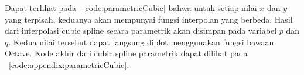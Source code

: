 

Dapat terlihat pada \lst~\ref{code:parametricCubic} bahwa untuk setiap nilai $x$
dan $y$ yang terpisah, keduanya akan mempunyai fungsi interpolan yang berbeda.
Hasil dari interpolasi \f{cubic spline} secara parametrik akan disimpan pada
variabel $p$ dan $q$. Kedua nilai tersebut dapat langsung diplot menggunakan
fungsi bawaan Octave. Kode akhir dari \f{cubic spline} parametrik dapat dilihat
pada \apdx~\ref{code:appendix:parametricCubic}.